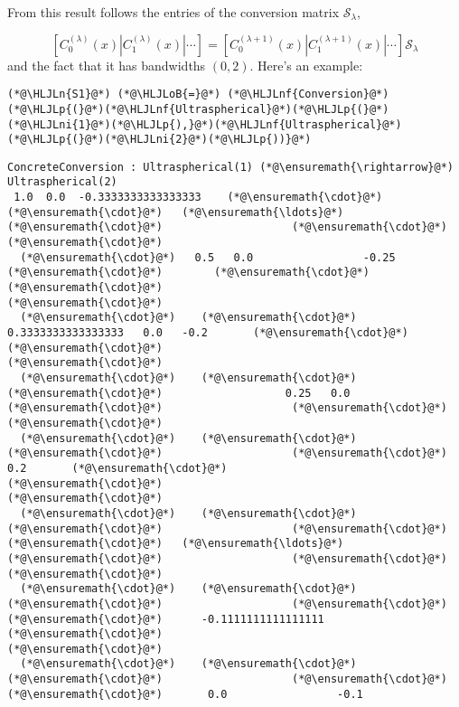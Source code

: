 \documentclass[12pt,landscape]{article}
\newcommand{\HLJLn}[1]{#1}
\newcommand{\HLJLnf}[1]{\textcolor[RGB]{66,102,213}{#1}}
\newcommand{\HLJLni}[1]{\textcolor[RGB]{59,151,46}{#1}}
\newcommand{\HLJLoB}[1]{\textcolor[RGB]{102,102,102}{\textbf{#1}}}
\newcommand{\HLJLp}[1]{#1}
\begin{document}
{From this result follows the entries of the conversion matrix $\mathcal{S}_{\lambda}$,

\[
\left[ C^{(\lambda)}_0(x) | C^{(\lambda)}_1(x) | \cdots  \right] = \left[ C^{(\lambda+1)}_0(x) | C^{(\lambda+1)}_1(x) | \cdots  \right]\mathcal{S}_{\lambda}
\]
and the fact that it has bandwidths $(0,2)$. Here's an example:


\begin{lstlisting}
(*@\HLJLn{S1}@*) (*@\HLJLoB{=}@*) (*@\HLJLnf{Conversion}@*)(*@\HLJLp{(}@*)(*@\HLJLnf{Ultraspherical}@*)(*@\HLJLp{(}@*)(*@\HLJLni{1}@*)(*@\HLJLp{),}@*)(*@\HLJLnf{Ultraspherical}@*)(*@\HLJLp{(}@*)(*@\HLJLni{2}@*)(*@\HLJLp{))}@*)
\end{lstlisting}

\begin{lstlisting}
ConcreteConversion : Ultraspherical(1) (*@\ensuremath{\rightarrow}@*) Ultraspherical(2)
 1.0  0.0  -0.3333333333333333    (*@\ensuremath{\cdot}@*)      (*@\ensuremath{\cdot}@*)   (*@\ensuremath{\ldots}@*)    (*@\ensuremath{\cdot}@*)                    (*@\ensuremath{\cdot}@*)   
(*@\ensuremath{\cdot}@*)
  (*@\ensuremath{\cdot}@*)   0.5   0.0                 -0.25    (*@\ensuremath{\cdot}@*)        (*@\ensuremath{\cdot}@*)                    (*@\ensuremath{\cdot}@*)   
(*@\ensuremath{\cdot}@*)
  (*@\ensuremath{\cdot}@*)    (*@\ensuremath{\cdot}@*)    0.3333333333333333   0.0   -0.2       (*@\ensuremath{\cdot}@*)                    (*@\ensuremath{\cdot}@*)   
(*@\ensuremath{\cdot}@*)
  (*@\ensuremath{\cdot}@*)    (*@\ensuremath{\cdot}@*)     (*@\ensuremath{\cdot}@*)                   0.25   0.0       (*@\ensuremath{\cdot}@*)                    (*@\ensuremath{\cdot}@*)   
(*@\ensuremath{\cdot}@*)
  (*@\ensuremath{\cdot}@*)    (*@\ensuremath{\cdot}@*)     (*@\ensuremath{\cdot}@*)                    (*@\ensuremath{\cdot}@*)     0.2       (*@\ensuremath{\cdot}@*)                    (*@\ensuremath{\cdot}@*)   
(*@\ensuremath{\cdot}@*)
  (*@\ensuremath{\cdot}@*)    (*@\ensuremath{\cdot}@*)     (*@\ensuremath{\cdot}@*)                    (*@\ensuremath{\cdot}@*)      (*@\ensuremath{\cdot}@*)   (*@\ensuremath{\ldots}@*)    (*@\ensuremath{\cdot}@*)                    (*@\ensuremath{\cdot}@*)   
(*@\ensuremath{\cdot}@*)
  (*@\ensuremath{\cdot}@*)    (*@\ensuremath{\cdot}@*)     (*@\ensuremath{\cdot}@*)                    (*@\ensuremath{\cdot}@*)      (*@\ensuremath{\cdot}@*)      -0.1111111111111111    (*@\ensuremath{\cdot}@*)   
(*@\ensuremath{\cdot}@*)
  (*@\ensuremath{\cdot}@*)    (*@\ensuremath{\cdot}@*)     (*@\ensuremath{\cdot}@*)                    (*@\ensuremath{\cdot}@*)      (*@\ensuremath{\cdot}@*)       0.0                 -0.1  

\end{lstlisting}}
\end{document}
